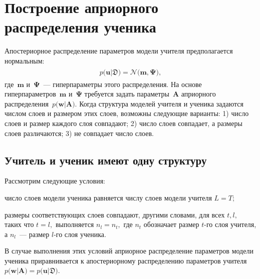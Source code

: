 \documentclass[12pt]{a&t}
\begin{document}
\section{Построение априорного распределения ученика}
Апостериорное распределение параметров модели учителя предполагается нормальным:
\begin{gather}
\label{eq:ap:1}
\begin{aligned}
p\bigr(\mathbf{u}|\mathfrak{D}\bigr) = \mathcal{N}\bigr(\mathbf{m}, \bm{\Psi}\bigr),
\end{aligned}
\end{gather}
где~$\mathbf{m}$ и~$\bm{\Psi}$~--- гиперпараметры этого распределения. На основе гиперпараметров~$\mathbf{m}$ и~$\bm{\Psi}$ требуется задать параметры~$\mathbf{A}$ априорного распределения~$p\bigr(\mathbf{w}|\mathbf{A}\bigr).$
Когда структура моделей учителя и ученика задаются числом слоев и размером этих слоев, возможны следующие варианты: 1) число слоев и размер каждого слоя совпадают; 2) число слоев совпадает, а размеры слоев различаются; 3) не совпадает число слоев.

\subsection{Учитель и ученик имеют одну структуру}
\label{section:one:space}
Рассмотрим следующие условия:
\begin{enumlist}
    \item число слоев модели ученика равняется числу слоев модели учителя $L=T$;
    \item размеры соответствующих слоев совпадают, другими словами, для всех $t, l,$ таких что $t=l,$ выполняется $n_l = n_t,$ где $n_t$ обозначает размер $t$-го слоя учителя, а $n_l$~--- размер $l$-го слоя ученика.
\end{enumlist}

В случае выполнения этих условий априорное распределение параметров модели ученика приравнивается к апостериорному распределению параметров учителя $p\bigr(\mathbf{w}|\mathbf{A}\bigr) = p\bigr(\mathbf{u}|\mathfrak{D}\bigr)$.
\end{document}
